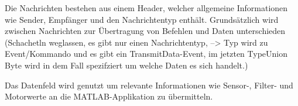 Die Nachrichten bestehen aus einem Header, welcher allgemeine Informationen wie Sender, Empfänger und den Nachrichtentyp enthält. Grundsätzlich wird zwischen Nachrichten zur Übertragung von Befehlen und Daten unterschieden (Schachetln weglassen, es gibt nur einen Nachrichtentyp, --> Typ wird zu Event/Kommando und es gibt ein TransmitData-Event, im jetzten TypeUnion Byte wird in dem Fall spezifziert um welche Daten es sich handelt.)

Das Datenfeld wird genutzt um relevante Informationen wie Sensor-, Filter- und Motorwerte an die MATLAB-Applikation zu übermitteln.